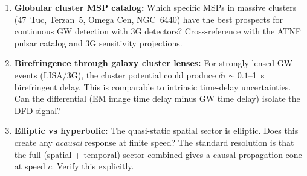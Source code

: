 \documentclass[11pt]{article}
\theoremstyle{definition}
\theoremstyle{remark}
\begin{document}
\begin{enumerate}[nosep]
\item \textbf{Globular cluster MSP catalog:} Which specific MSPs
  in massive clusters (47~Tuc, Terzan~5, Omega Cen, NGC~6440)
  have the best prospects for continuous GW detection with 3G
  detectors? Cross-reference with the ATNF pulsar catalog and
  3G sensitivity projections.

\item \textbf{Birefringence through galaxy cluster lenses:}
  For strongly lensed GW events (LISA/3G), the cluster potential
  could produce $\delta\tau \sim 0.1$--1~s birefringent delay.
  This is comparable to intrinsic time-delay uncertainties. Can
  the differential (EM image time delay minus GW time delay)
  isolate the DFD signal?

\item \textbf{Elliptic vs hyperbolic:} The quasi-static spatial
  sector is elliptic. Does this create any \emph{acausal}
  response at finite speed? The standard resolution is that the
  full (spatial + temporal) sector combined gives a causal
  propagation cone at speed $c$. Verify this explicitly.
\end{enumerate}
\end{document}

